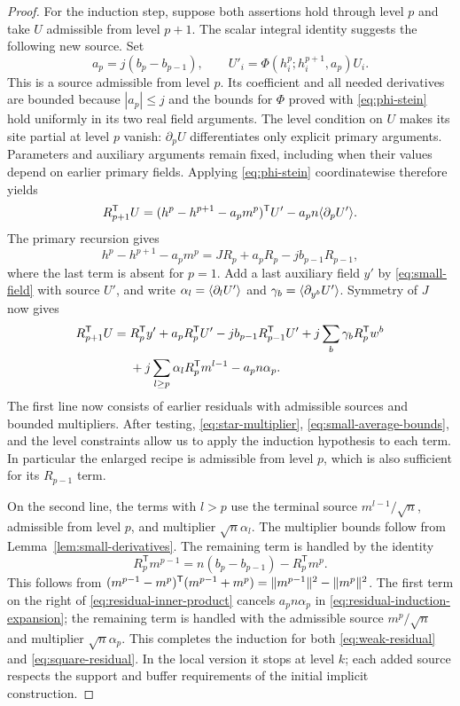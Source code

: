 \begin{proof}
For the induction step, suppose both assertions hold through level $p$
and take $U$ admissible from level $p+1$. The scalar integral identity
suggests the following new source. Set
\[
 a_p=j(b_p-b_{p-1}),\qquad
 U'_i=\Phi(h_i^p;h_i^{p+1},a_p)U_i.
\]
This is a source admissible from level $p$.  Its coefficient and all
needed derivatives are bounded because $|a_p|\leq j$ and the bounds for
$\Phi$ proved with \eqref{eq:phi-stein} hold uniformly in its two real
field arguments.
The level condition on $U$ makes its site partial at level $p$ vanish:
$\partial_pU$ differentiates only explicit primary arguments. Parameters
and auxiliary arguments remain fixed, including when their values depend
on earlier primary fields.  Applying \eqref{eq:phi-stein} coordinatewise
therefore yields
\[
 R_{p+1}^{\mathsf T}U
 =(h^p-h^{p+1}-a_pm^p)^{\mathsf T}U'
                      -a_p n\langle \partial_pU'\rangle.
\]
The primary recursion gives
\[
 h^p-h^{p+1}-a_pm^p
       =JR_p+a_pR_p-jb_{p-1}R_{p-1},
\]
where the last term is absent for $p=1$.  Add a last auxiliary field
$y'$ by \eqref{eq:small-field} with source $U'$, and write
$\alpha_l=\langle \partial_lU'\rangle$ and
$\gamma_b=\langle \partial_{y^b}U'\rangle$.  Symmetry of $J$ now gives
\begin{align}
 R_{p+1}^{\mathsf T}U
 ={}&R_p^{\mathsf T}y'+a_pR_p^{\mathsf T}U'
              -jb_{p-1}R_{p-1}^{\mathsf T}U'
              +j\sum_b\gamma_bR_p^{\mathsf T}w^b\notag\\
    &+j\sum_{l\geq p}\alpha_lR_p^{\mathsf T}m^{l-1}
                   -a_pn\alpha_p.
 \label{eq:residual-induction-expansion}
\end{align}
The first line now consists of earlier residuals with admissible sources
and bounded multipliers. After testing, \eqref{eq:star-multiplier},
\eqref{eq:small-average-bounds}, and the level constraints allow us to
apply the induction hypothesis to each term. In particular the enlarged
recipe is admissible from level $p$, which is
also sufficient for its $R_{p-1}$ term.

On the second line, the terms with $l>p$ use the terminal source
$m^{l-1}/\sqrt n$, admissible from level $p$, and multiplier
$\sqrt n\alpha_l$. The multiplier bounds follow from
Lemma~\ref{lem:small-derivatives}. The remaining term is handled by the
identity
\begin{equation}
 R_p^{\mathsf T}m^{p-1}
       =n(b_p-b_{p-1})-R_p^{\mathsf T}m^p.
 \label{eq:residual-inner-product}
\end{equation}
This follows from
$(m^{p-1}-m^p)^{\mathsf T}(m^{p-1}+m^p)
=\lVert m^{p-1}\rVert^2-\lVert m^p\rVert^2$.
The first term on the right of \eqref{eq:residual-inner-product}
cancels $a_pn\alpha_p$ in
\eqref{eq:residual-induction-expansion}; the remaining term is handled
with the admissible source $m^p/\sqrt n$ and multiplier
$\sqrt n\alpha_p$. This completes the induction for both
\eqref{eq:weak-residual} and
\eqref{eq:square-residual}. In the local version it stops at level $k$;
each added source respects the support and buffer requirements of the
initial implicit construction.
\end{proof}


